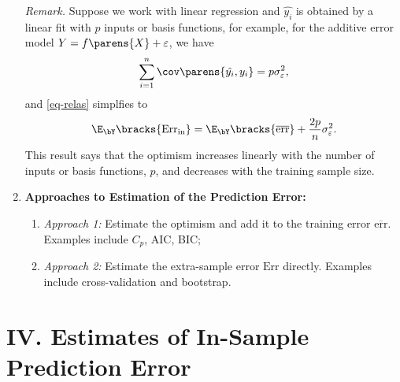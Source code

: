 \documentclass[12pt]{article}
\begin{document}
\begin{enumerate}[label=\textbf{\arabic*.}]
	\textit{Remark.} Suppose we work with linear regression and $\hat{y_i}$ is obtained by a linear fit with $p$ inputs or basis functions, for example, for the additive error model $Y = f \parens{X} + \varepsilon$, we have 
	\begin{align*}
		\sum_{i=1}^n \cov \parens{\hat{y_i}, y_i} = p \sigma_{\varepsilon}^2, 
	\end{align*}
	and \eqref{eq-relas} simplfies to 
	\begin{align}\label{eq-insample}
		\E_{\bY} \bracks{\mathrm{Err}_{\mathrm{in}}} = \E_{\bY} \bracks{\overline{\mathrm{err}}} + \frac{2p}{n} \sigma_{\varepsilon}^2. 
	\end{align}
	This result says that the optimism increases linearly with the number of inputs or basis functions, $p$, and decreases with the training sample size. 
	
	\item \textbf{Approaches to Estimation of the Prediction Error:} 
	\begin{enumerate}
		\item \textit{Approach 1:} Estimate the optimism and add it to the training error $\overline{\mathrm{err}}$. Examples include $C_p$, AIC, BIC; 
		\item \textit{Approach 2:} Estimate the extra-sample error $\mathrm{Err}$ directly. Examples include cross-validation and bootstrap. 
	\end{enumerate}
\end{enumerate}


\section*{IV. Estimates of In-Sample Prediction Error}
\end{document}
